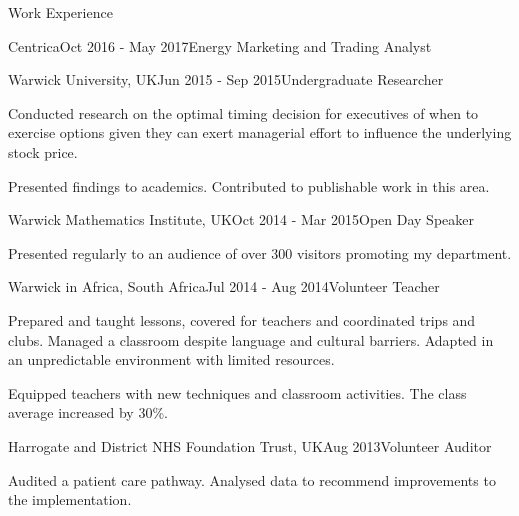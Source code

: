 \documentclass{resume} %
\begin{document}
\begin{rSection}{Work Experience}
\begin{rSubsection}{Centrica}{Oct 2016 - May 2017}{Energy Marketing and Trading Analyst}{}
	\end{rSubsection}
	

\begin{rSubsection}{Warwick University, UK}{Jun 2015 - Sep 2015}{Undergraduate Researcher}{}
\item Conducted research on the optimal timing decision for executives of when to exercise options given they can exert managerial effort to influence the underlying stock price.  
\item Presented findings to academics. Contributed to publishable work in this area.
\end{rSubsection}


\begin{rSubsection}{Warwick Mathematics Institute, UK}{Oct 2014 - Mar 2015}{Open Day Speaker}{}
\item Presented regularly to an audience of over 300 visitors promoting my department. 
\end{rSubsection}

\begin{rSubsection}{Warwick in Africa, South Africa}{Jul 2014 - Aug 2014}{Volunteer Teacher}{}
\item Prepared and taught lessons, covered for teachers and coordinated trips and clubs. Managed a classroom despite language and cultural barriers. Adapted in an unpredictable environment with limited resources.
\item Equipped teachers with new techniques and classroom activities. The class average increased by 30\%.  
\end{rSubsection}



\begin{rSubsection}{Harrogate and District NHS Foundation Trust, UK}{Aug 2013}{Volunteer Auditor}{}
\item Audited a patient care pathway. Analysed data to recommend improvements to the implementation. 
\end{rSubsection}

\iffalse


\end{rSection}
\end{document}
